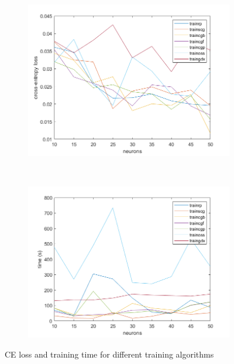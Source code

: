 \documentclass[11pt,a4paper]{article}
\begin{document}
\begin{figure}[htb]
  \centering
  \begin{subfigure}[b]{0.48\textwidth}
    \centering
    \includegraphics[width=\textwidth]{figures/traininng_algo_comparison_CE.png}
  \end{subfigure}
  ~
  \begin{subfigure}[b]{0.48\textwidth}
    \centering
    \includegraphics[width=\textwidth]{figures/traininng_algo_comparison_time.png}
  \end{subfigure}
  \caption{CE loss and training time for different training algorithms}
  \label{fig:algoCompare}
\end{figure}
\end{document}
